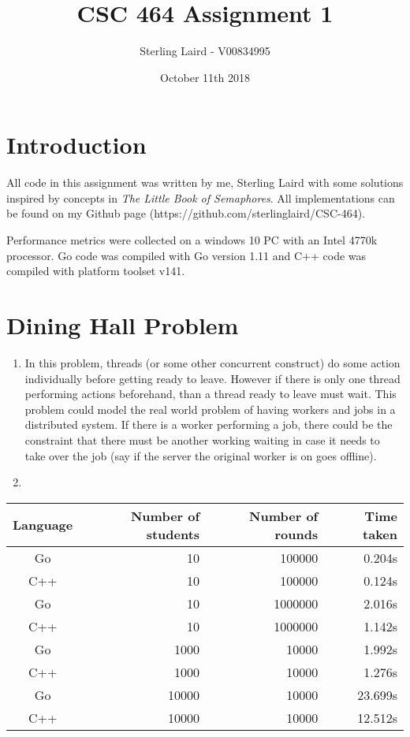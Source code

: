 \documentclass[11pt]{article}
\title{CSC 464 Assignment 1}
\author{Sterling Laird - V00834995}
\date{October 11th 2018}
\begin{document}
\maketitle

\section{Introduction}
All code in this assignment was written by me, Sterling Laird with some solutions inspired by concepts in \textit{The Little Book of Semaphores}. All implementations can be found on my Github page (https://github.com/sterlinglaird/CSC-464).\linebreak

\noindent Performance metrics were collected on a windows 10 PC with an Intel 4770k processor. Go code was compiled with Go version 1.11 and C++ code was compiled with platform toolset v141.


\section{Dining Hall Problem}
\begin{enumerate}
	\item In this problem, threads (or some other concurrent construct) do some action individually before getting ready to leave. However if there is only one thread performing actions beforehand, than a thread ready to leave must wait. This problem could model the real world problem of having workers and jobs in a distributed system. If there is a worker performing a job, there could be the constraint that there must be another working waiting in case it needs to take over the job (say if the server the original worker is on goes offline).
	\item
\end{enumerate}

\begin{tabular}{c r r r}
Language    & Number of students & Number of rounds & Time taken \\
\toprule
Go 			& 10 & 100000 & 0.204s \\
C++         & 10 & 100000 & 0.124s \\
\cmidrule{1-4}
Go 			& 10 & 1000000 & 2.016s \\
C++         & 10 & 1000000 & 1.142s \\
\cmidrule{1-4}
Go 			& 1000 & 10000 & 1.992s \\
C++         & 1000 & 10000 & 1.276s \\
\cmidrule{1-4}
Go 			& 10000 & 10000 & 23.699s \\
C++         & 10000 & 10000 & 12.512s \\
\end{tabular}
\end{document}
